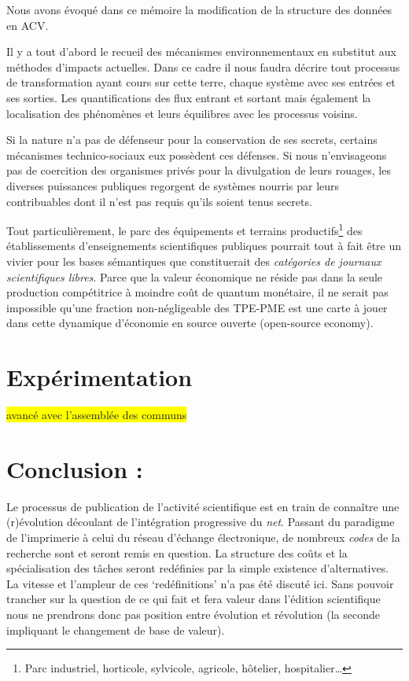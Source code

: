 Nous avons évoqué dans ce mémoire la modification de la structure des données en \gls{ACV}.

Il y a tout d'abord le recueil des mécanismes environnementaux en substitut aux méthodes d'impacts actuelles.
Dans ce cadre il nous faudra décrire tout processus de transformation ayant cours sur cette terre, chaque système avec ses entrées et ses sorties.
Les quantifications des flux entrant et sortant mais également la localisation des phénomènes et leurs équilibres avec les processus voisins.

Si la nature n'a pas de défenseur pour la conservation de ses secrets, certains mécanismes technico-sociaux eux possèdent ces défenses.
Si nous n'envisageons pas de coercition des organismes privés pour la divulgation de leurs rouages, les diverses puissances publiques regorgent de systèmes nourris par leurs contribuables dont il n'est pas requis qu'ils soient tenus secrets.

Tout particulièrement, le parc des équipements et terrains productifs\footnote{Parc industriel, horticole, sylvicole, agricole, hôtelier, hospitalier\ldots} des établissements d'enseignements scientifiques publiques pourrait tout à fait être un vivier pour les bases sémantiques que constituerait des \emph{catégories de journaux scientifiques libres}.
Parce que la valeur économique ne réside pas dans la seule production compétitrice à moindre coût de quantum monétaire, il ne serait pas impossible qu'une fraction non-négligeable des TPE-PME est une carte à jouer dans cette dynamique d'économie en source ouverte (open-source economy).
\section{Expérimentation}
\begin{center}
\colorbox{yellow}{avancé avec l'assemblée des communs}
\end{center}

\section{Conclusion :}
Le processus de publication de l'activité scientifique est en train de connaître une (r)évolution découlant de l'intégration progressive du \emph{net}.
Passant du paradigme de l'imprimerie à celui du réseau d'échange électronique, de nombreux \emph{codes} de la recherche sont et seront remis en question.
La structure des coûts et la spécialisation des tâches seront redéfinies par la simple existence d'alternatives.
La vitesse et l'ampleur de ces `redéfinitions' n'a pas été discuté ici.
Sans pouvoir trancher sur la question de ce qui fait et fera valeur dans l'édition scientifique nous ne prendrons donc pas position entre évolution et révolution (la seconde impliquant le changement de base de valeur).

